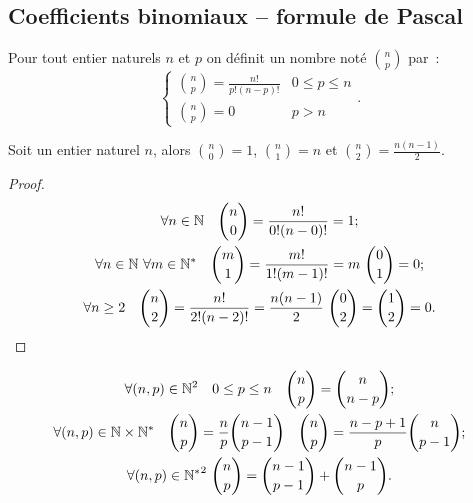 \subsection{Coefficients binomiaux -- formule de Pascal}

\begin{defdef}
  Pour tout entier naturels $n$ et $p$ on définit un nombre noté $\binom{n}{p}$ par~:
  \begin{equation}
    \begin{cases}
      \binom{n}{p}=\frac{n!}{p!(n-p)!} & 0\leq p \leq n \\
      \binom{n}{p}=0 & p > n
    \end{cases}.
  \end{equation}
\end{defdef}
\begin{prop}
  Soit un entier naturel $n$, alors $\binom{n}{0}=1$, $\binom{n}{1}=n$ et $\binom{n}{2}=\frac{n(n-1)}{2}$.
\end{prop}
\begin{proof}
  \begin{gather}
    \forall n \in \N \quad \binom{n}{0}=\frac{n!}{0!(n-0)!}=1; \\
    \forall n \in \N \ \forall m\in \N^* \quad \binom{m}{1}=\frac{m!}{1!(m-1)!}=m \ \binom{0}{1}=0;\\
    \forall n \geq 2 \quad \binom{n}{2}=\frac{n!}{2!(n-2)!}=\frac{n(n-1)}{2} \ \binom{0}{2}=\binom{1}{2}=0.
  \end{gather}
\end{proof}
\begin{prop}
  \begin{gather}
    \forall (n,p)\in\N^2 \quad 0\leq p \leq n \quad \binom{n}{p}=\binom{n}{n-p};\\
    \forall (n,p)\in\N\times\N^* \quad \binom{n}{p}=\frac{n}{p}\binom{n-1}{p-1} \quad \binom{n}{p}=\frac{n-p+1}{p}\binom{n}{p-1};\\
    \forall (n,p)\in{\N^*}^2 \ \binom{n}{p}=\binom{n-1}{p-1}+\binom{n-1}{p}.
  \end{gather}
\end{prop}
